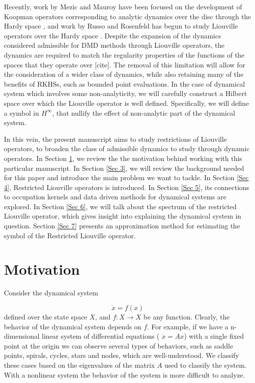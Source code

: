 \documentclass[preprint,12pt]{elsarticle} %
\theoremstyle{plain}
\theoremstyle{definition}
\theoremstyle{remark}
\begin{document}
Recently, work by Mezic and Mauroy have been focused on the development of Koopman operators corresponding to analytic dynamics over the disc through the Hardy space \cite{mauroy2024analytic}, and work by Russo and Rosenfeld has begun to study Liouville operators over the Hardy space \cite{russo2022liouville}. Despite the expansion of the dynamics considered admissible for DMD methods through Liouville operators, the dynamics are required to match the regularity properties of the functions of the spaces that they operate over [cite]. The removal of this limitation will allow for the consideration of a wider class of dynamics, while also retaining many of the benefits of RKHSs, such as bounded point evaluations. In the case of dynamical system which involves some non-analyticity, we will carefully construct a Hilbert space over which the Liouville operator is well defined. Specifically, we will define a symbol in $H^\infty$, that nullify the effect of non-analytic part of the dynamical system. 

 In this vein, the present manuscript aims to study restrictions of Liouville operators, to broaden the class of admissible dynamics to study through dynamic operators. In Section \ref{Sec 2}, we review the the motivation behind working with this particular manuscript. In Section \ref{Sec 3}, we will review the background needed for this paper and introduce the main problem we want to tackle. In Section \ref{Sec 4}, Restricted Liouville operators is introduced. In Section \ref{Sec 5}, its connections to occupation kernels and data driven methods for dynamical systems are explored. In Section \ref{Sec 6}, we will talk about the spectrum of the restricted Liouville operator, which gives insight into explaining the dynamical system in question. Section \ref{Sec 7} presents an approximation method for estimating the symbol of the Restricted Liouville operator.

\section{Motivation}\label{Sec 2}

Consider the dynamical system

$$
\dot{x}=f(x)
$$
defined over the state space $X$, and $f:X\rightarrow X$ be any function. Clearly, the behavior of the dynamical system depends on $f$. For example, if we have a n-dimensional linear system of differential equations (
$\dot{x}=Ax$) with a single fixed point at the origin we can observe several types of behaviors, such as saddle points, spirals, cycles, stars and nodes, which are well-understood. We classify these cases based on the eigenvalues of the matrix $A$ used to classify the system. With a nonlinear system the behavior of the system is more difficult to analyze. 
\end{document}
